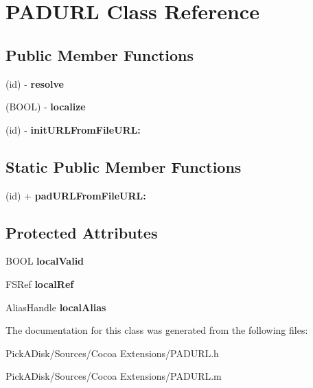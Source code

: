 \hypertarget{interface_p_a_d_u_r_l}{
\section{PADURL Class Reference}
\label{interface_p_a_d_u_r_l}
}
\subsection*{Public Member Functions}
\begin{DoxyCompactItemize}
\item 
\hypertarget{interface_p_a_d_u_r_l_a37c072fa363766560d51de3de5d001ae}{
(id) -\/ {\bfseries resolve}}
\label{interface_p_a_d_u_r_l_a37c072fa363766560d51de3de5d001ae}

\item 
\hypertarget{interface_p_a_d_u_r_l_ab99102b924470b6ec5a47badf1b0d59b}{
(BOOL) -\/ {\bfseries localize}}
\label{interface_p_a_d_u_r_l_ab99102b924470b6ec5a47badf1b0d59b}

\item 
\hypertarget{interface_p_a_d_u_r_l_aff5e54815dffc5826628cfa3afb86f5d}{
(id) -\/ {\bfseries initURLFromFileURL:}}
\label{interface_p_a_d_u_r_l_aff5e54815dffc5826628cfa3afb86f5d}

\end{DoxyCompactItemize}
\subsection*{Static Public Member Functions}
\begin{DoxyCompactItemize}
\item 
\hypertarget{interface_p_a_d_u_r_l_a37c131a12daf7ec9f77e3f525c2a5ec2}{
(id) + {\bfseries padURLFromFileURL:}}
\label{interface_p_a_d_u_r_l_a37c131a12daf7ec9f77e3f525c2a5ec2}

\end{DoxyCompactItemize}
\subsection*{Protected Attributes}
\begin{DoxyCompactItemize}
\item 
\hypertarget{interface_p_a_d_u_r_l_ad61c0ce8bea32636eab874338bd58586}{
BOOL {\bfseries localValid}}
\label{interface_p_a_d_u_r_l_ad61c0ce8bea32636eab874338bd58586}

\item 
\hypertarget{interface_p_a_d_u_r_l_a0bff4e67bb2872cdc239c65b6c0776ba}{
FSRef {\bfseries localRef}}
\label{interface_p_a_d_u_r_l_a0bff4e67bb2872cdc239c65b6c0776ba}

\item 
\hypertarget{interface_p_a_d_u_r_l_a49a52334634f9907fa7c0581f2628eb3}{
AliasHandle {\bfseries localAlias}}
\label{interface_p_a_d_u_r_l_a49a52334634f9907fa7c0581f2628eb3}

\end{DoxyCompactItemize}


The documentation for this class was generated from the following files:\begin{DoxyCompactItemize}
\item 
PickADisk/Sources/Cocoa Extensions/PADURL.h\item 
PickADisk/Sources/Cocoa Extensions/PADURL.m\end{DoxyCompactItemize}
